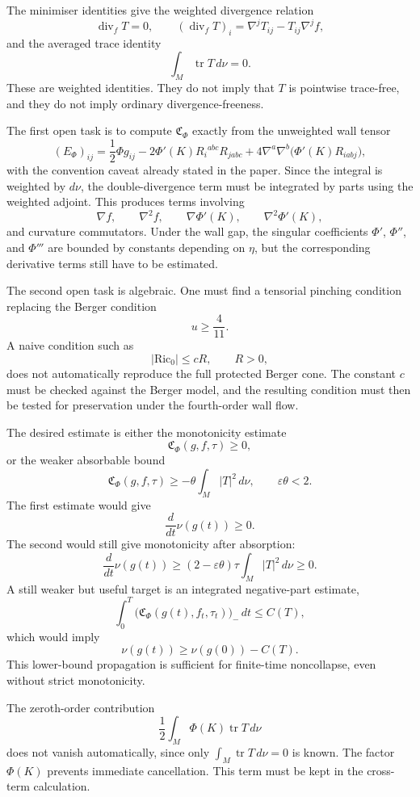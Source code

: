 \documentclass[11pt]{amsart}
\newcommand{\Ric}{\mathrm{Ric}}
\begin{document}
The minimiser identities give the weighted divergence relation
\[
\operatorname{div}_f T = 0,\qquad
(\operatorname{div}_f T)_i = \nabla^j T_{ij} - T_{ij}\nabla^j f,
\]
and the averaged trace identity
\[
\int_M\operatorname{tr}T\,d\nu = 0 .
\]
These are weighted identities.  They do not imply that \(T\) is pointwise
trace-free, and they do not imply ordinary divergence-freeness.

The first open task is to compute \(\mathfrak C_\Phi\) exactly from the
unweighted wall tensor
\[
(E_\Phi)_{ij}= \frac12\Phi g_{ij}
-2\Phi'(K)R_i{}^{abc}R_{jabc}
+ 4\nabla^a\nabla^b\bigl(\Phi'(K)R_{iabj}\bigr),
\]
with the convention caveat already stated in the paper.  Since the integral is
weighted by \(d\nu\), the double-divergence term must be integrated by parts
using the weighted adjoint.  This produces terms involving
\[
\nabla f,\qquad \nabla^2 f,\qquad \nabla\Phi'(K),\qquad \nabla^2\Phi'(K),
\]
and curvature commutators.  Under the wall gap, the singular coefficients
\(\Phi'\), \(\Phi''\), and \(\Phi'''\) are bounded by constants depending on
\(\eta\), but the corresponding derivative terms still have to be estimated.

The second open task is algebraic.  One must find a tensorial pinching
condition replacing the Berger condition
\[
u\ge \frac4{11}.
\]
A naive condition such as
\[
|\Ric_0|\le cR,\qquad R>0,
\]
does not automatically reproduce the full protected Berger cone.  The constant
\(c\) must be checked against the Berger model, and the resulting condition
must then be tested for preservation under the fourth-order wall flow.

The desired estimate is either the monotonicity estimate
\[
\mathfrak C_\Phi(g,f,\tau) \ge 0,
\]
or the weaker absorbable bound
\[
\mathfrak C_\Phi(g,f,\tau) \ge -\theta\int_M|T|^2\,d\nu,\qquad
\varepsilon\theta < 2 .
\]
The first estimate would give
\[
\frac{d}{dt}\nu(g(t)) \ge 0 .
\]
The second would still give monotonicity after absorption:
\[
\frac{d}{dt}\nu(g(t)) \ge (2-\varepsilon\theta)\tau\int_M|T|^2\,d\nu \ge 0 .
\]
A still weaker but useful target is an integrated negative-part estimate,
\[
\int_0^T \bigl(\mathfrak C_\Phi(g(t),f_t,\tau_t)\bigr)_- \,dt \le C(T),
\]
which would imply
\[
\nu(g(t)) \ge \nu(g(0)) - C(T).
\]
This lower-bound propagation is sufficient for finite-time noncollapse, even
without strict monotonicity.

The zeroth-order contribution
\[
\frac12\int_M\Phi(K)\operatorname{tr}T\,d\nu
\]
does not vanish automatically, since only \(\int_M\operatorname{tr}T\,d\nu =0\)
is known.  The factor \(\Phi(K)\) prevents immediate cancellation.  This term
must be kept in the cross-term calculation.
\end{document}
